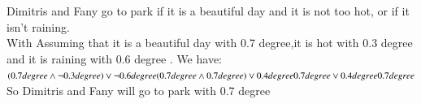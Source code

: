 \documentclass{article}
\begin{document}
Dimitris and Fany go to park if it is a beautiful day and it is not too hot, or if it isn't raining.\\
With  Assuming that it is a beautiful day with 0.7 degree,it is hot with 0.3 degree and it is raining with 0.6 degree . We have:\\
$(0.7 degree \land \lnot 0.3  degree)  \lor \lnot0.6 degree  \\
(0.7 degree \land  0.7  degree)  \lor 0.4 degree \\
0.7  degree  \lor 0.4 degree  \\
0.7 degree \\
$
So  Dimitris and Fany will go to park with 0.7 degree \\
\end{document}
